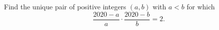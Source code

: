 Find the unique pair of positive integers $(a,b)$ with $a< b$ for which
\[\frac{2020-a}{a}\cdot \frac{2020-b}{b}=2.\]
